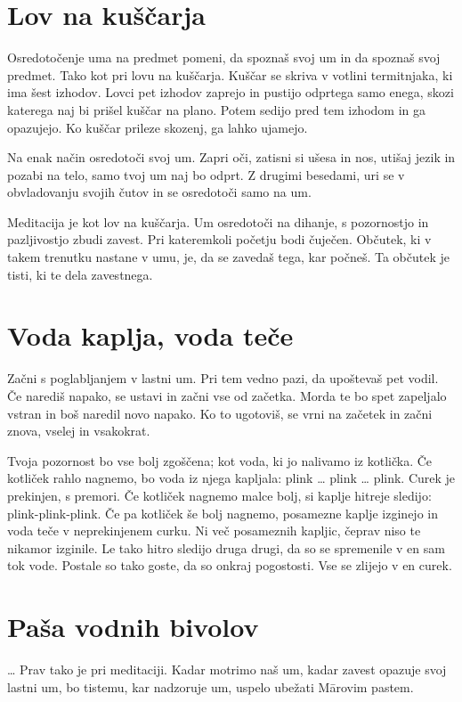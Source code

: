 \section{Lov na kuščarja}

Osredotočenje uma na predmet pomeni, da spoznaš svoj um in da spoznaš svoj predmet. Tako kot pri lovu na kuščarja. Kuščar se skriva v votlini termitnjaka, ki ima šest izhodov. Lovci pet izhodov zaprejo in pustijo odprtega samo enega, skozi katerega naj bi prišel kuščar na plano. Potem sedijo pred tem izhodom in ga opazujejo. Ko kuščar prileze skozenj, ga lahko ujamejo.

Na enak način osredotoči svoj um. Zapri oči, zatisni si ušesa in nos, utišaj jezik in pozabi na telo, samo tvoj um naj bo odprt. Z drugimi besedami, uri se v obvladovanju svojih čutov in se osredotoči samo na um.

Meditacija je kot lov na kuščarja. Um osredotoči na dihanje, s pozornostjo in pazljivostjo zbudi zavest. Pri kateremkoli početju bodi čuječen. Občutek, ki v takem trenutku nastane v umu, je, da se zavedaš tega, kar počneš. Ta občutek je tisti, ki te dela zavestnega.

\section{Voda kaplja, voda teče}

Začni s poglabljanjem v lastni um. Pri tem vedno pazi, da upoštevaš pet vodil. Če narediš napako, se ustavi in začni vse od začetka. Morda te bo spet zapeljalo vstran in boš naredil novo napako. Ko to ugotoviš, se vrni na začetek in začni znova, vselej in vsakokrat.

Tvoja pozornost bo vse bolj zgoščena; kot voda, ki jo nalivamo iz kotlička. Če kotliček rahlo nagnemo, bo voda iz njega kapljala: plink \ldots{} plink \ldots{} plink. Curek je prekinjen, s premori. Če kotliček nagnemo malce bolj, si kaplje hitreje sledijo: plink-plink-plink. Če pa kotliček še bolj nagnemo, posamezne kaplje izginejo in voda teče v neprekinjenem curku. Ni več posameznih kapljic, čeprav niso te nikamor izginile. Le tako hitro sledijo druga drugi, da so se spremenile v en sam tok vode. Postale so tako goste, da so onkraj pogostosti. Vse se zlijejo v en curek.

\section{Paša vodnih bivolov}

\ldots{} Prav tako je pri meditaciji. Kadar motrimo naš um, kadar zavest opazuje svoj lastni um, bo tistemu, kar nadzoruje um, uspelo ubežati Mārovim pastem.


